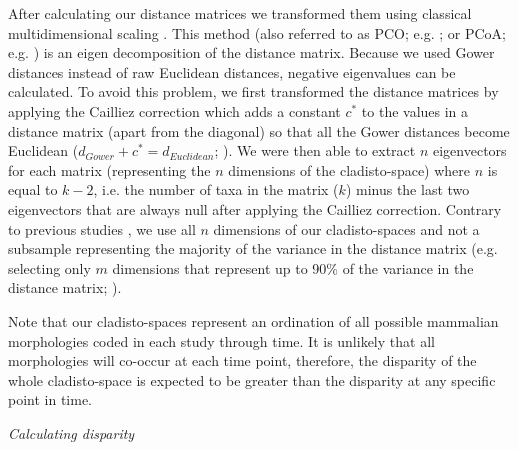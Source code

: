 \documentclass[12pt,letterpaper]{article}
\renewcommand{\subsection}[1]{%
\bigskip
\begin{center}
\begin{large}
\normalfont\itshape #1
\end{large}
\end{center}}
\renewcommand{\subsubsection}[1]{%
\vspace{2ex}
\noindent
\textit{#1.}---}
\begin{document}
After calculating our distance matrices we transformed them using classical multidimensional scaling \citep[MDS;][]{torgerson1965multidimensional,GOWER01121966,cailliez1983analytical}.
This method (also referred to as PCO; e.g. \citealt{Brusatte2015}; or PCoA; e.g. \citealt{paradisape:2004}) is an eigen decomposition of the distance matrix.
Because we used Gower distances instead of raw Euclidean distances, negative eigenvalues can be calculated.
To avoid this problem, we first transformed the distance matrices by applying the Cailliez correction \citep{cailliez1983analytical} which adds a constant $c^*$ to the values in a distance matrix (apart from the diagonal) so that all the Gower distances become Euclidean ($d_{Gower}+c^*=d_{Euclidean}$; \citealt{cailliez1983analytical}). 
We were then able to extract $n$ eigenvectors for each matrix (representing the $n$ dimensions of the cladisto-space) where $n$ is equal to $k-2$, i.e. the number of taxa in the matrix ($k$) minus the last two eigenvectors that are always null after applying the Cailliez correction.
Contrary to previous studies \citep[e.g][]{brusatte50,cisneros2010,prentice2011,anderson2012using,Hughes20082013,bentonmodels2014}, we use all $n$ dimensions of our cladisto-spaces and not a subsample representing the majority of the variance in the distance matrix (e.g. selecting only $m$ dimensions that represent up to 90\% of the variance in the distance matrix; \citealt{Brusatte12092008,toljagictriassic-jurassic2013}).

Note that our cladisto-spaces represent an ordination of all possible mammalian morphologies coded in each study through time.
It is unlikely that all morphologies will co-occur at each time point, therefore, the disparity of the whole cladisto-space is expected to be greater than the disparity at any specific point in time.

\subsection{Calculating disparity}
\end{document}

